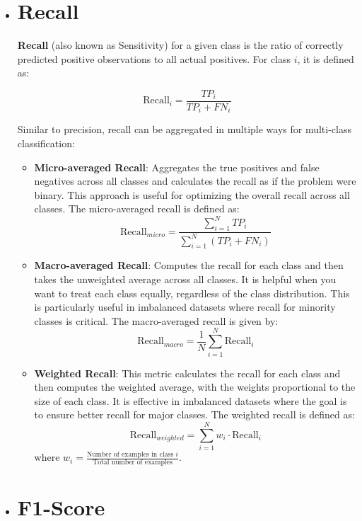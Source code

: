 \begin{itemize}
\item \section{Recall}
\label{subsubsec:recall}

\textbf{Recall} (also known as Sensitivity) for a given class is the ratio of correctly predicted positive observations to all actual positives. For class $i$, it is defined as:

\[
    \text{Recall}_i = \frac{TP_i}{TP_i + FN_i}
    \label{eq:recall}
\]

Similar to precision, recall can be aggregated in multiple ways for multi-class classification:

\begin{itemize}
    \item \textbf{Micro-averaged Recall}: Aggregates the true positives and false negatives across all classes and calculates the recall as if the problem were binary. This approach is useful for optimizing the overall recall across all classes. The micro-averaged recall is defined as:
    \[
        \text{Recall}_{micro} = \frac{\sum_{i=1}^{N} TP_i}{\sum_{i=1}^{N} (TP_i + FN_i)}
    \]

    \item \textbf{Macro-averaged Recall}: Computes the recall for each class and then takes the unweighted average across all classes. It is helpful when you want to treat each class equally, regardless of the class distribution. This is particularly useful in imbalanced datasets where recall for minority classes is critical. The macro-averaged recall is given by:
    \[
        \text{Recall}_{macro} = \frac{1}{N} \sum_{i=1}^{N} \text{Recall}_i
    \]

    \item \textbf{Weighted Recall}: This metric calculates the recall for each class and then computes the weighted average, with the weights proportional to the size of each class. It is effective in imbalanced datasets where the goal is to ensure better recall for major classes. The weighted recall is defined as:
    \[
        \text{Recall}_{weighted} = \sum_{i=1}^{N} w_i \cdot \text{Recall}_i
    \]
    where $w_i = \frac{\text{Number of examples in class } i}{\text{Total number of examples}}$.
\end{itemize}

\item \section{F1-Score}
\label{subsubsec:f1_score}


\end{itemize}
